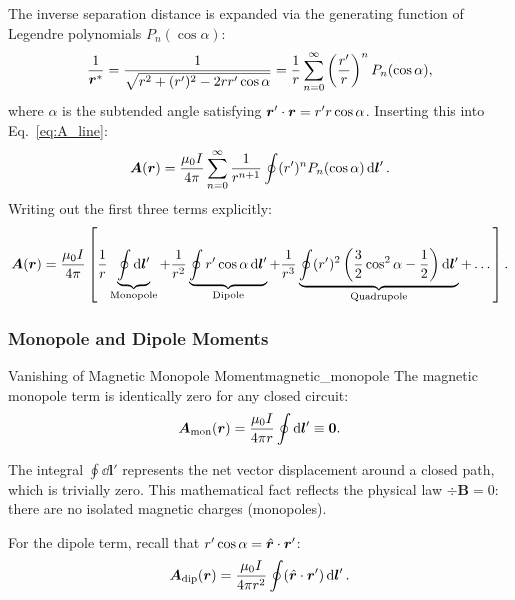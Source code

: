 The inverse separation distance is expanded via the generating function of Legendre polynomials $P_n(\cos\alpha)$:
\begin{equation}
    \frac{1}{\bm{r}^*} = \frac{1}{\sqrt{r^2 + (r')^2 - 2rr'\cos\alpha}} = \frac{1}{r} \sum_{n=0}^\infty \left(\frac{r'}{r}\right)^n P_n(\cos\alpha),
\end{equation}
where $\alpha$ is the subtended angle satisfying $\bm{r}'\cdot \bm{r} = r' r \cos\alpha$. Inserting this into Eq.~\eqref{eq:A_line}:
\begin{equation}
    \bm{A}(\bm{r}) = \frac{\mu_0 I}{4\pi} \sum_{n=0}^\infty \frac{1}{r^{n+1}} \oint (r')^n P_n(\cos\alpha) \dd{\bm{l}'}.
\end{equation}
Writing out the first three terms explicitly:
\begin{equation}
    \bm{A}(\bm{r}) = \frac{\mu_0 I}{4\pi} \left[ \frac{1}{r}\underbrace{\oint \dd{\bm{l}'}}_{\text{Monopole}} + \frac{1}{r^2}\underbrace{\oint r'\cos\alpha \dd{\bm{l}'}}_{\text{Dipole}} + \frac{1}{r^3}\underbrace{\oint (r')^2 \left(\frac{3}{2}\cos^2\alpha - \frac{1}{2}\right) \dd{\bm{l}'}}_{\text{Quadrupole}} + \dots \right].
\end{equation}

\subsubsection{Monopole and Dipole Moments}

\begin{theorem}{Vanishing of Magnetic Monopole Moment}{magnetic_monopole}
    The magnetic monopole term is identically zero for any closed circuit:
    \begin{equation}
        \bm{A}_{\text{mon}}(\bm{r}) = \frac{\mu_0 I}{4\pi r} \oint \dd{\bm{l}'} \equiv \bm{0}.
    \end{equation}
\end{theorem}
\begin{proofbox}
    The integral $\oint \dd{\bm{l}'}$ represents the net vector displacement around a closed path, which is trivially zero. This mathematical fact reflects the physical law $\div \bm{B} = 0$: there are no isolated magnetic charges (monopoles).
\end{proofbox}

For the dipole term, recall that $r'\cos\alpha = \hat{\bm{r}}\cdot \bm{r}'$:
\begin{equation}
    \bm{A}_{\text{dip}}(\bm{r}) = \frac{\mu_0 I}{4\pi r^2} \oint (\hat{\bm{r}}\cdot \bm{r}')\dd{\bm{l}'}.
\end{equation}


